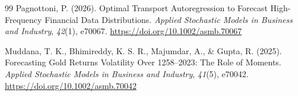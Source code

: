 \documentclass[11pt,a4paper]{article}
\begin{document}
\begin{thebibliography}{99}
 Pagnottoni, P. (2026). Optimal Transport Autoregression to Forecast High-Frequency Financial Data Distributions. \emph{Applied Stochastic Models in Business and Industry}, \emph{42}(1), e70067. \url{https://doi.org/10.1002/asmb.70067}

 Muddana, T. K., Bhimireddy, K. S. R., Majumdar, A., \& Gupta, R. (2025). Forecasting Gold Returns Volatility Over 1258--2023: The Role of Moments. \emph{Applied Stochastic Models in Business and Industry}, \emph{41}(5), e70042. \url{https://doi.org/10.1002/asmb.70042}
\end{thebibliography}
\end{document}
